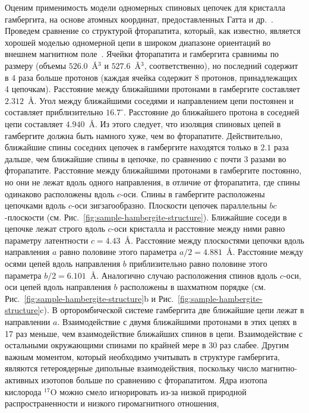 Оценим применимость модели одномерных спиновых цепочек для кристалла гамбергита,
на основе атомных координат, предоставленных Гатта и др.~\cite{Gatta2012}.
Проведем сравнение со структурой фторапатита,
который, как известно,
является хорошей моделью одномерной цепи в широком диапазоне ориентаций во внешнем магнитном поле~\cite{Bochkin2019}.
Ячейки фторапатита и гамбергита сравнимы по размеру (объемы $526.0$~\r{A}$^3$ и $527.6$~\r{A}$^3$, соответственно),
но последний содержит в 4 раза больше протонов
(каждая ячейка содержит 8 протонов, принадлежащих 4 цепочкам).
Расстояние между ближайшими протонами в гамбергите составляет $2.312$~\r{A}.
Угол между ближайшими соседями и направлением цепи постоянен и составляет приблизительно $16.7^\circ$.
Расстояние до ближайшего протона в соседней цепи составляет $4.940$~\r{A}.
Из этого следует, что изоляция спиновых цепей в гамбергите должна быть намного хуже, чем во фторапатите.
Действительно, ближайшие спины соседних цепочек в гамбергите находятся только в $2.1$ раза дальше,
чем ближайшие спины в цепочке,
по сравнению с почти 3 разами во фторапатите.
Расстояние между ближайшими протонами в гамбергите постоянно,
но они не лежат вдоль одного направления,
в отличие от фторапатита,
где спины одинаково расположены вдоль $c$-оси.
Спины в гамбергите расположены цепочками вдоль $c$-оси зигзагообразно.
Плоскости цепочек параллельны $bc$-плоскости  (см. Рис.~\ref{fig:sample-hambergite-structure}).
Ближайшие соседи в цепочке лежат строго вдоль $c$-оси кристалла
и расстояние между ними равно параметру латентности $c = 4.43$~\r{A}.
Расстояние между плоскостями цепочки вдоль направления $a$ равно половине этого параметра $a/2 = 4.881$~\r{A}.
Расстояние между осями цепей вдоль направления $b$ приблизительно равно половине этого параметра $b/2 = 6.101$~\r{A}.
Аналогично случаю расположения спинов вдоль $c$-оси,
оси цепей вдоль направления $b$ расположены в шахматном порядке (см. Рис.~\ref{fig:sample-hambergite-structure}b и Рис.~\ref{fig:sample-hambergite-structure}c).
В орторомбической системе гамбергита две ближайшие цепи лежат в направлении $a$.
Взаимодействие с двумя ближайшими протонами в этих цепях в 17 раз меньше,
чем взаимодействие ближайших спинов в цепи.
Взаимодействие с остальными окружающими спинами по крайней мере в 30 раз слабее.
Другим важным моментом, который необходимо учитывать в структуре гамбергита,
являются гетероядерные дипольные взаимодействия,
поскольку число магнитно-активных изотопов больше по сравнению с фторапатитом.
Ядра изотопа  кислорода $^17$O можно смело игнорировать из-за низкой природной распространенности и низкого гиромагнитного отношения,
